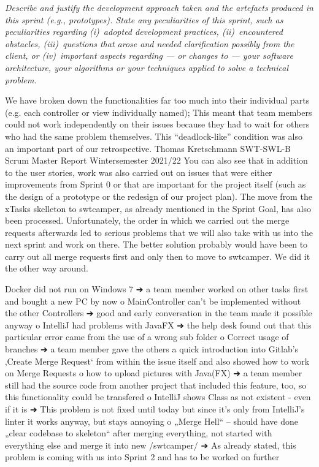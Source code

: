 \emph{Describe and justify the development approach taken and the artefacts produced in this sprint (e.g., prototypes).  State any peculiarities of this sprint, such as peculiarities  regarding (i)~adopted development practices, (ii)~encountered obstacles, (iii)~questions that arose and needed clarification possibly from the client, or (iv)~important aspects regarding --- or changes to --- your software architecture, your algorithms or your techniques applied to solve a technical problem.}

We have broken down the functionalities far too
much into their individual parts (e.g. each controller or view individually named); This meant
that team members could not work independently on their issues because they had to wait
for others who had the same problem themselves. This “deadlock-like” condition was also an
important part of our retrospective.
Thomas Kretschmann SWT-SWL-B
Scrum Master Report Wintersemester 2021/22
You can also see that in addition to the user stories, work was also carried out on issues that
were either improvements from Sprint 0 or that are important for the project itself (such as
the design of a prototype or the redesign of our project plan).
The move from the xTasks skelleton to swtcamper, as already mentioned in the Sprint Goal,
has also been processed. Unfortunately, the order in which we carried out the merge
requests afterwards led to serious problems that we will also take with us into the next sprint
and work on there.
The better solution probably would have been to carry out all merge requests first and only
then to move to swtcamper. We did it the other way around.

Docker did not run on Windows 7
➔ a team member worked on other tasks first and bought a new PC by now
o MainController can't be implemented without the other Controllers
➔ good and early conversation in the team made it possible anyway
o IntelliJ had problems with JavaFX
➔ the help desk found out that this particular error came from the use of a wrong
sub folder
o Correct usage of branches
➔ a team member gave the others a quick introduction into Gitlab’s ‚Create Merge
Request‘ from within the issue itself and also showed how to work on Merge
Requests
o how to upload pictures with Java(FX)
➔ a team member still had the source code from another project that included this
feature, too, so this functionality could be transfered
o IntelliJ shows Class as not existent - even if it is
➔ This problem is not fixed until today but since it’s only from IntelliJ’s linter it
works anyway, but stays annoying
o „Merge Hell“ – should have done „clear codebase to skeleton“ after merging
everything, not started with everything else and merge it into new /swtcamper/
➔ As already stated, this problem is coming with us into Sprint 2 and has to be
worked on further
